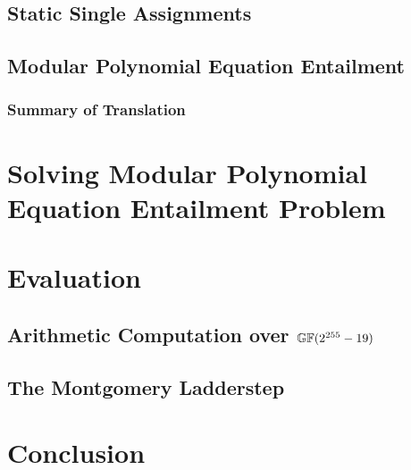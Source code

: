 \documentclass{llncs}
\begin{document}
\subsection{Static Single Assignments}
\label{subsection:translation:static-single-assignment}



\subsection{Modular Polynomial Equation Entailment}
\label{subsection:translation:multivariant-polynomial-equations}


\subsubsection*{Summary of Translation}



\section{Solving Modular Polynomial Equation Entailment Problem}
\label{section:solving-algebraic-equations}


\section{Evaluation}
\label{section:evaluation}


\subsection{Arithmetic Computation over $\mathbb{GF}(2^{255}-19)$}
\label{subection:evaluation:multiplication}


\subsection{The Montgomery Ladderstep}
\label{subsection:evaluation:ladder-step}


\section{Conclusion}
\label{section:conclusion}


\newpage



\end{document}
